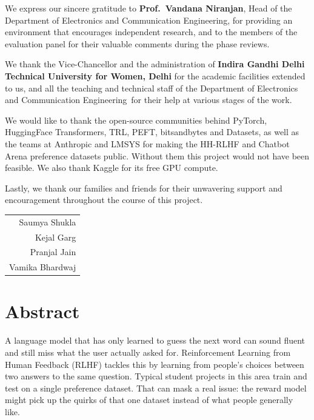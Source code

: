 \documentclass[a4paper,12pt,oneside]{report}
\newcommand{\StudentA}{Saumya Shukla}    \newcommand{\EnrollA}{05901022023}
\newcommand{\StudentB}{Kejal Garg}       \newcommand{\EnrollB}{07901022023}
\newcommand{\StudentC}{Pranjal Jain}     \newcommand{\EnrollC}{08101022023}
\newcommand{\StudentD}{Vamika Bhardwaj}  \newcommand{\EnrollD}{00411022024}
\newcommand{\HODName}{Prof.\ Vandana Niranjan}
\newcommand{\Department}{Electronics and Communication Engineering}
\newcommand{\University}{Indira Gandhi Delhi Technical University for Women}
\begin{document}
We express our sincere gratitude to \textbf{\HODName}, Head of the Department of \Department, for providing an environment that encourages independent research, and to the members of the evaluation panel for their valuable comments during the phase reviews.

We thank the Vice-Chancellor and the administration of \textbf{\University, Delhi} for the academic facilities extended to us, and all the teaching and technical staff of the Department of \Department\ for their help at various stages of the work.

We would like to thank the open-source communities behind PyTorch, HuggingFace Transformers, TRL, PEFT, bitsandbytes and Datasets, as well as the teams at Anthropic and LMSYS for making the HH-RLHF and Chatbot Arena preference datasets public. Without them this project would not have been feasible. We also thank Kaggle for its free GPU compute.

Lastly, we thank our families and friends for their unwavering support and encouragement throughout the course of this project.

\vspace{1.2cm}
\hfill\begin{tabular}{r}
\StudentA\\ \StudentB\\ \StudentC\\ \StudentD
\end{tabular}

\newpage
\chapter*{Abstract}
A language model that has only learned to guess the next word can sound fluent and still miss what the user actually asked for. Reinforcement Learning from Human Feedback (RLHF) tackles this by learning from people's choices between two answers to the same question. Typical student projects in this area train and test on a single preference dataset. That can mask a real issue: the reward model might pick up the quirks of that one dataset instead of what people generally like.
\end{document}
